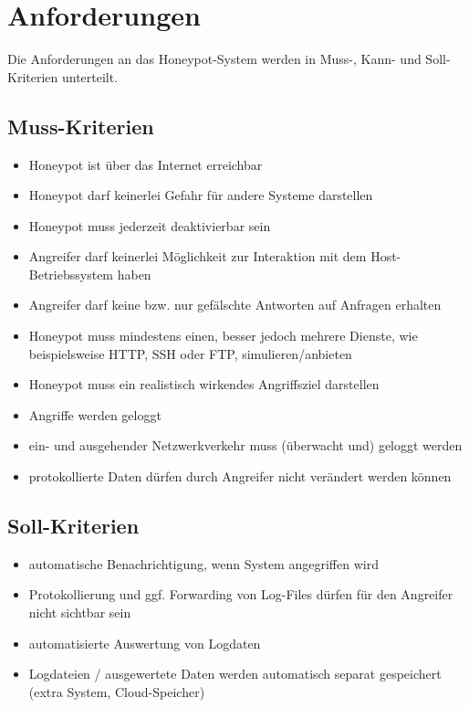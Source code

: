 \chapter{Anforderungen}
\label{ch:Anforderungen}

Die Anforderungen an das Honeypot-System werden in Muss-, Kann- und Soll-Kriterien unterteilt.


\section{Muss-Kriterien}
\label{sec:Muss-Kriterien}
\begin{itemize}
\item Honeypot ist über das Internet erreichbar
\item Honeypot darf keinerlei Gefahr für andere Systeme darstellen
\item Honeypot muss jederzeit deaktivierbar sein
\item Angreifer darf keinerlei Möglichkeit zur Interaktion mit dem Host-Betriebssystem haben
\item Angreifer darf keine bzw. nur gefälschte Antworten auf Anfragen erhalten
\item Honeypot muss mindestens einen, besser jedoch mehrere Dienste, wie beispielsweise HTTP, SSH oder FTP, simulieren/anbieten
\item Honeypot muss ein realistisch wirkendes Angriffsziel darstellen
\item Angriffe werden geloggt
\item ein- und ausgehender Netzwerkverkehr muss (überwacht und) geloggt werden 
\item protokollierte Daten dürfen durch Angreifer nicht verändert werden können

\end{itemize}

\newpage

\section{Soll-Kriterien}
\label{sec:Soll-Kriterien}
\begin{itemize}
\item automatische Benachrichtigung, wenn System angegriffen wird
\item Protokollierung und ggf. Forwarding von Log-Files dürfen für den Angreifer nicht sichtbar sein
\item automatisierte Auswertung von Logdaten
\item Logdateien / ausgewertete Daten werden automatisch separat gespeichert (extra System, Cloud-Speicher)
\end{itemize}



